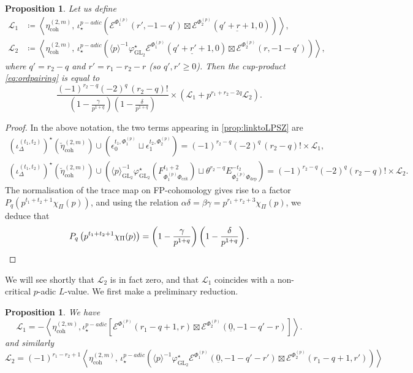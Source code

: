 \documentclass[cjm]{ipart}
\theoremstyle{plain}
\newtheorem{proposition}[theorem]{Proposition}
\theoremstyle{remark}
\DeclareMathOperator{\coh}{coh}
\DeclareMathOperator{\crit}{crit}
\DeclareMathOperator{\GL}{GL}
\newcommand{\cE}{\mathcal{E}}
\newcommand{\dep}{\mathrm{dep}}
\newcommand{\sL}{\mathscr{L}}
\numberwithin{equation}{subsection}
\renewcommand{\ge}{\geqslant}
\begin{document}
  \begin{proposition}
   \label{def:sLi}
   Let us define
   \begin{align}
    \sL_1 &\coloneqq \left\langle \eta^{(2,m)}_{\coh},\,\iota_\star^{p-adic}\left(\cE^{\Phi_1^{(p)}}(r', -1-q')\boxtimes \cE^{\Phi_2^{(p)}}(\underline{q' + r + 1},0)\right)\right\rangle,\\
    \sL_2 &\coloneqq \left\langle\eta^{(2,m)}_{\coh},\, \iota_\star^{p-adic}\left(\langle p\rangle^{-1}\varphi_{\GL_2}^\star \cE^{\Phi_1^{(p)}}(\underline{q'+r'+1}, 0)\boxtimes \cE^{\Phi_2^{(p)}}(r,-1-q')\right)\right\rangle,
   \end{align}
   where $q' = r_2 - q$ and $r' = r_1-r_2 - r$ (so $q', r' \ge 0$). Then the cup-product \eqref{eq:ordpairing} is equal to
   \[ \frac{(-1)^{r_2-q}(-2)^q\, (r_2-q)!}{\left(1-\tfrac{\gamma}{p^{1+q}}\right)\left(1-\tfrac{\delta}{p^{1+q}}\right)} \times \left(\sL_1 + p^{r_1 + r_2 - 2q} \sL_2\right).\]
  \end{proposition}


  \begin{proof}
   In the above notation, the two terms appearing in \ref{prop:linktoLPSZ} are
   \begin{gather*}
    (\iota^{(t_1,t_2)}_\Delta)^\star(\breve\eta^{(2,m)}_{\coh})\cup \left(\epsilon^{t_1,\Phi^{(p)}_1}_0\sqcup \epsilon^{t_2,\Phi^{(p)}_2}_1\right) = (-1)^{r_2-q}(-2)^q\, (r_2-q)!\times \sL_1,\\
    (\iota^{(t_1,t_2)}_\Delta)^\star(\breve\eta^{(2,m)}_{\coh})\cup \left( \langle p\rangle_{\GL_2}^{-1}\varphi_{\GL_2}^\star\left(F^{t_1+2}_{\Phi^{(p)}_1\Phi_{\crit}}\right)\sqcup\theta^{r_2-q}E^{-t_2}_{\Phi^{(p)}_2\Phi_{\dep}}\right) = (-1)^{r_2-q}(-2)^q(r_2-q)!\times\sL_2.
   \end{gather*}
   The normalisation of the trace map on FP-cohomology gives rise to a factor $P_q\left(p^{t_1+t_2+1}\chi_\Pi(p)\right)$, and using the relation $\alpha\delta=\beta\gamma=p^{r_1+r_2+3}\chi_\Pi(p)$, we deduce that
   \[
    P_q\left(p^{t_1+t_2+1}\chi_\Pi(p)\right) = \left(1-\frac{\gamma}{p^{1+q}}\right)\left(1-\frac{\delta}{p^{1+q}}\right).\qedhere
   \]
  \end{proof}

  We will see shortly that $\sL_2$ is in fact zero, and that $\sL_1$ coincides with a non-critical $p$-adic $L$-value. We first make a preliminary reduction.

  \begin{proposition}
   \label{prop:thetainvar}
   We have
   \[\sL_1 = -\left\langle\eta^{(2,m)}_{\coh}, \iota^{p-adic}_\star\left[\cE^{\Phi_1^{(p)}}(r_1-q+1, r)\boxtimes  \cE^{\Phi_2^{(p)}}(\underline{0},-1-q'-r)\right]\right\rangle.\label{xi1stterm}
   \]
   and similarly
   \[
    \sL_2 = (-1)^{r_1 - r_2 + 1} \left\langle\eta^{(2,m)}_{\coh},\, \iota_\star^{p-adic}\left(\langle p\rangle^{-1}\varphi_{\GL_2}^\star \cE^{\Phi_1^{(p)}}(\underline{0}, -1-q'-r')\boxtimes \cE^{\Phi_2^{(p)}}(r_1 - q+1, r')\right)\right\rangle\]
  \end{proposition}
\end{document}
